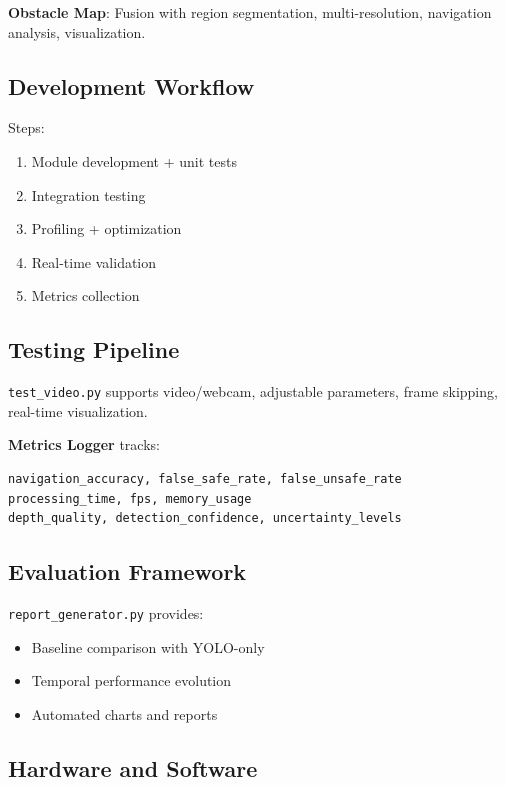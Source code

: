 \documentclass[12pt,oneside]{book}
\begin{document}
\textbf{Obstacle Map}:
Fusion with region segmentation, multi-resolution, navigation analysis, visualization.

\subsection{Development Workflow}

Steps:
\begin{enumerate}
\item Module development + unit tests
\item Integration testing
\item Profiling + optimization
\item Real-time validation
\item Metrics collection
\end{enumerate}

\subsection{Testing Pipeline}

\texttt{test\_video.py} supports video/webcam, adjustable parameters, frame skipping, real-time visualization.

\textbf{Metrics Logger} tracks:
\begin{verbatim}
navigation_accuracy, false_safe_rate, false_unsafe_rate
processing_time, fps, memory_usage
depth_quality, detection_confidence, uncertainty_levels
\end{verbatim}

\subsection{Evaluation Framework}

\texttt{report\_generator.py} provides:
\begin{itemize}
\item Baseline comparison with YOLO-only
\item Temporal performance evolution
\item Automated charts and reports
\end{itemize}

\subsection{Hardware and Software}
\end{document}
